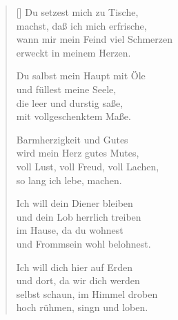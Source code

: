 \begin{multicols}{2}
\begin{verse}[\versewidth]
 Du setzest mich zu Tische,\\
machst, daß ich mich erfrische,\\
wann mir mein Feind viel Schmerzen\\
erweckt in meinem Herzen.

 Du salbst mein Haupt mit Öle\\
und füllest meine Seele,\\
die leer und durstig saße,\\
mit vollgeschenktem Maße.

 Barmherzigkeit und Gutes\\
wird mein Herz gutes Mutes,\\
voll Lust, voll Freud, voll Lachen,\\
so lang ich lebe, machen.

 Ich will dein Diener bleiben\\
und dein Lob herrlich treiben\\
im Hause, da du wohnest\\
und Frommsein wohl belohnest.

 Ich will dich hier auf Erden\\
und dort, da wir dich werden\\
selbst schaun, im Himmel droben\\
hoch rühmen, singn und loben.

\end{verse}
\end{multicols}
